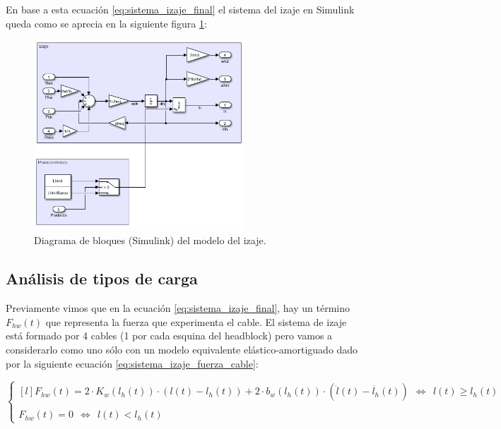 \documentclass[11pt]{article}
\begin{document}
En base a esta ecuación \ref{eq:sistema_izaje_final} el sistema del izaje en Simulink queda como se aprecia en la siguiente figura \ref{fig:sistema_izaje_simulink}:

\begin{figure}[h!]
	\centering
	\includegraphics[width=0.7\textwidth]{images/imagen_6_simulink_izaje.png}
	\caption{Diagrama de bloques (Simulink) del modelo del izaje.}
	\label{fig:sistema_izaje_simulink}
\end{figure}

\newpage

\subsection{Análisis de tipos de carga}
\label{section:carga}

Previamente vimos que en la ecuación \ref{eq:sistema_izaje_final}, hay un término $F_{hw}(t)$ que representa la fuerza que experimenta el cable. El sistema de izaje está formado por 4 cables (1 por cada esquina del headblock) pero vamos a considerarlo como uno sólo con un modelo equivalente elástico-amortiguado dado por la siguiente ecuación \ref{eq:sistema_izaje_fuerza_cable}:

\begin{equation}
	\label{eq:sistema_izaje_fuerza_cable}
	\left\{
		\begin{matrix*}[l]
		F_{hw}(t)=2\cdot K_{w}\left ( l_{h}(t) \right )\cdot \left ( l(t)-l_{h}(t) \right )+2\cdot b_{w}\left ( l_{h}(t) \right )\cdot ( \dot{l}(t)-\dot{l_{h}}(t) ) \ \ \Leftrightarrow\ \ l(t)\geq l_{h}(t)
		\\
		\\ 
		F_{hw}(t)= 0\ \ \Leftrightarrow\ \ l(t)<l_{h}(t)
		\end{matrix*}
	\right.
\end{equation}
\end{document}
